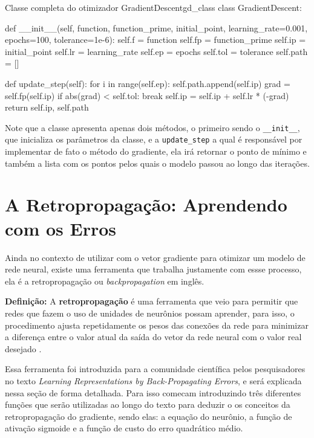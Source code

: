 \begin{codelisting}{Classe completa do otimizador GradientDescent}{gd_class}
class GradientDescent:

    def __init__(self, function, function_prime, initial_point, learning_rate=0.001, epochs=100, tolerance=1e-6):
        self.f = function
        self.fp = function_prime
        self.ip = initial_point
        self.lr = learning_rate
        self.ep = epochs
        self.tol = tolerance
        self.path = []

    def update_step(self):
        for i in range(self.ep):
            self.path.append(self.ip)
            grad = self.fp(self.ip)
            if abs(grad) < self.tol: break
            self.ip = self.ip + self.lr * (-grad)
        return self.ip, self.path
\end{codelisting}

Note que a classe apresenta apenas dois métodos, o primeiro sendo o \texttt{\_\_init\_\_}, que inicializa os parâmetros da classe, e a \texttt{update\_step} a qual é responsável por implementar de fato o método do gradiente, ela irá retornar o ponto de mínimo e também a lista com os pontos pelos quais o modelo passou ao longo das iterações.


\section{A Retropropagação: Aprendendo com os Erros}

Ainda no contexto de utilizar com o vetor gradiente para otimizar um modelo de rede neural, existe uma ferramenta que trabalha justamente com essse processo, ela é a retropropagação ou \textit{backpropagation} em inglês.

\begin{definicaomoderna}{\textbf{Definição:}}
A \textbf{retropropagação} é uma ferramenta que veio para permitir que redes que fazem o uso de unidades de neurônios possam aprender, para isso, o procedimento ajusta repetidamente os pesos das conexões da rede para minimizar a diferença entre o valor atual da saída do vetor da rede neural com o valor real desejado \parencite{BackpropagationArticle}.
\end{definicaomoderna}

Essa ferramenta foi introduzida para a comunidade científica pelos pesquisadores \textcite{BackpropagationArticle} no texto \textit{Learning Representations by Back-Propagating Errors}, e será explicada nessa seção de forma detalhada. Para isso \textcite{BackpropagationArticle} comecam introduzindo três diferentes funções que serão utilizadas ao longo do texto para deduzir o os conceitos da retropropagação do gradiente, sendo elas: a equação do neurônio, a função de ativação sigmoide e a função de custo do erro quadrático médio.


